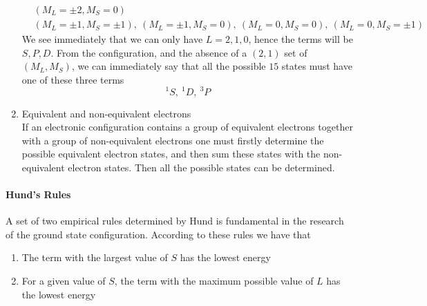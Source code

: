\documentclass[../qm.tex]{subfiles}
\begin{document}
\begin{enumerate}
		\begin{equation*}
			\begin{aligned}
				&(M_L=\pm2,M_S=0)\\
				&(M_L=\pm1,M_S=\pm1),\ (M_L=\pm1,M_S=0),\ (M_L=0,M_S=0),\ (M_L=0,M_S=\pm1)
			\end{aligned}
		\end{equation*}
		We see immediately that we can only have $L=2,1,0$, hence the terms will be $S,P,D$. From the configuration, and the absence of a $(2,1)$ set of $(M_L,M_S)$, we can immediately say that all the possible $15$ states must have one of these three terms
		\begin{equation*}
			^1S,\ ^1D,\ ^3P
		\end{equation*}
	\item Equivalent and non-equivalent electrons\\
		If an electronic configuration contains a group of equivalent electrons together with a group of non-equivalent electrons one must firstly determine the possible equivalent electron states, and then sum these states with the non-equivalent electron states. Then all the possible states can be determined. %
	\end{enumerate}
	\paragraph{Hund's Rules}
	A set of two empirical rules determined by Hund is fundamental in the research of the ground state configuration. According to these rules we have that
	\begin{enumerate}
	\item The term with the largest value of $S$ has the lowest energy
	\item For a given value of $S$, the term with the maximum possible value of $L$ has the lowest energy
	\end{enumerate}
\end{document}
